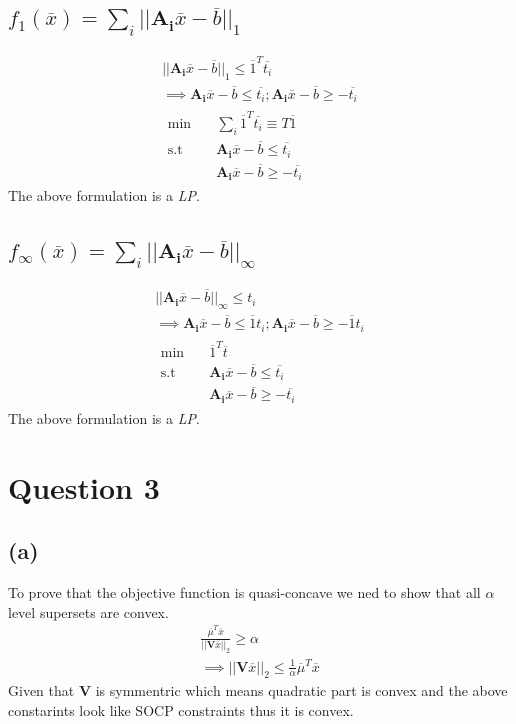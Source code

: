 \documentclass{article}
\begin{document}
\subsection*{$f_1(\overline{x}) = \sum_{i}||\mathbf{A_i}\overline{x} - \overline{b}||_1$}
\begin{gather*}
	||\mathbf{A_i}\overline{x} - \overline{b}||_1 \le \overline{1}^T\overline{t_i}\\
	\implies \mathbf{A_i}\overline{x} - \overline{b} \le \overline{t_i}; \mathbf{A_i}\overline{x} - \overline{b} \ge -\overline{t_i}\\
	\begin{aligned}
		\min \quad & \sum_{i}\overline{1}^T\overline{t_i} \equiv T\overline{1}\\
		\textrm{s.t} \quad & \mathbf{A_i}\overline{x} - \overline{b} \le \overline{t_i}\\
		& \mathbf{A_i}\overline{x} - \overline{b} \ge -\overline{t_i}
	\end{aligned}
\end{gather*}
The above formulation is a \textit{LP}.
\subsection*{$f_\infty(\overline{x}) = \sum_{i}||\mathbf{A_i}\overline{x} - \overline{b}||_\infty$}
\begin{gather*}
	||\mathbf{A_i}\overline{x} - \overline{b}||_\infty \le t_i\\
	\implies \mathbf{A_i}\overline{x} - \overline{b} \le \overline{1}t_i; \mathbf{A_i}\overline{x} - \overline{b} \ge -\overline{1}t_i\\
	\begin{aligned}
		\min \quad & \overline{1}^T\overline{t} \\
		\textrm{s.t} \quad & \mathbf{A_i}\overline{x} - \overline{b} \le \overline{t_i}\\
		& \mathbf{A_i}\overline{x} - \overline{b} \ge -\overline{t_i}
	\end{aligned}
\end{gather*}
The above formulation is a \textit{LP}.
\section*{\hfil Question 3}
\subsection*{(a)}
To prove that the objective function is quasi-concave we ned to show that all $\alpha$ level supersets are convex.
	\begin{gather*}
		\frac{\overline{\mu}^T\overline{x}}{||\mathbf{V}\overline{x}||_2} \ge \alpha\\
		\implies ||\mathbf{V}\overline{x}||_2 \le \frac{1}{\alpha}\overline{\mu}^T\overline{x}
	\end{gather*}
	Given that $\mathbf{V}$ is symmentric which means quadratic part is convex and the above constarints look like SOCP constraints thus it is convex.
\end{document}
